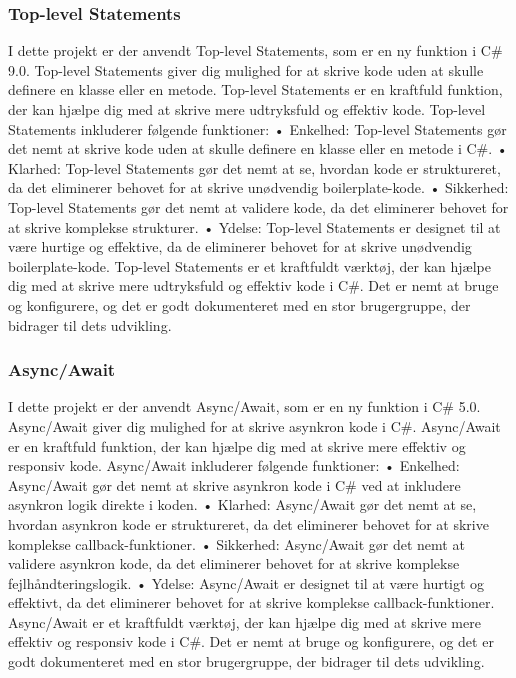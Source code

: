 \subsubsection{Top-level Statements}
I dette projekt er der anvendt Top-level Statements, som er en ny funktion i C\# 9.0. Top-level Statements giver dig mulighed for at skrive kode uden at skulle definere en klasse eller en metode. Top-level Statements er en kraftfuld funktion, der kan hjælpe dig med at skrive mere udtryksfuld og effektiv kode.
Top-level Statements inkluderer følgende funktioner:
•	Enkelhed: Top-level Statements gør det nemt at skrive kode uden at skulle definere en klasse eller en metode i C#.
•	Klarhed: Top-level Statements gør det nemt at se, hvordan kode er struktureret, da det eliminerer behovet for at skrive unødvendig boilerplate-kode.
•	Sikkerhed: Top-level Statements gør det nemt at validere kode, da det eliminerer behovet for at skrive komplekse strukturer.
•	Ydelse: Top-level Statements er designet til at være hurtige og effektive, da de eliminerer behovet for at skrive unødvendig boilerplate-kode.
Top-level Statements er et kraftfuldt værktøj, der kan hjælpe dig med at skrive mere udtryksfuld og effektiv kode i C#. Det er nemt at bruge og konfigurere, og det er godt dokumenteret med en stor brugergruppe, der bidrager til dets udvikling.

\subsubsection{Async/Await}
I dette projekt er der anvendt Async/Await, som er en ny funktion i C\# 5.0. Async/Await giver dig mulighed for at skrive asynkron kode i C#. Async/Await er en kraftfuld funktion, der kan hjælpe dig med at skrive mere effektiv og responsiv kode.
Async/Await inkluderer følgende funktioner:
•	Enkelhed: Async/Await gør det nemt at skrive asynkron kode i C# ved at inkludere asynkron logik direkte i koden.
•	Klarhed: Async/Await gør det nemt at se, hvordan asynkron kode er struktureret, da det eliminerer behovet for at skrive komplekse callback-funktioner.
•	Sikkerhed: Async/Await gør det nemt at validere asynkron kode, da det eliminerer behovet for at skrive komplekse fejlhåndteringslogik.
•	Ydelse: Async/Await er designet til at være hurtigt og effektivt, da det eliminerer behovet for at skrive komplekse callback-funktioner.
Async/Await er et kraftfuldt værktøj, der kan hjælpe dig med at skrive mere effektiv og responsiv kode i C#. Det er nemt at bruge og konfigurere, og det er godt dokumenteret med en stor brugergruppe, der bidrager til dets udvikling.


